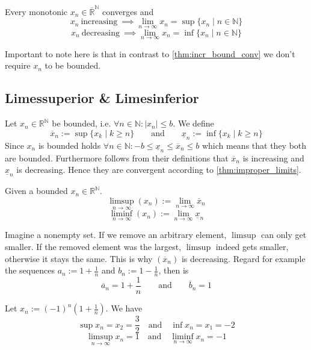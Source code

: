 \begin{theorem}\label{thm:improper_limits}
   Every monotonic \(x_n \in \overline{\mathbb{R}}^\mathbb{N}\) converges and
   \[x_n~\text{increasing}~\implies \lim_{n \to \infty} x_n = \sup\{x_n \mid n \in \mathbb{N}\}\]
   \[x_n~\text{decreasing}~\implies \lim_{n \to \infty} x_n = \inf\{x_n \mid n \in \mathbb{N}\}\]
\end{theorem}
\begin{remark}
   Important to note here is that in contrast to \cref{thm:incr_bound_conv} we don't require \(x_n\) to be bounded.
\end{remark}

\subsection{Limessuperior \& Limesinferior}
Let \(x_n \in \mathbb{R}^\mathbb{N}\) be bounded, i.e. \(\forall n \in \mathbb{N}: |x_n| \leq b\).
We define
\[\overline{x}_n := \sup\{x_k \mid k \geq n\} \qquad\text{and}\qquad \underline{x}_n := \inf\{x_k \mid k \geq n\}\]
Since \(x_n\) is bounded holds \(\forall n \in \mathbb{N}: -b \leq \underline{x}_n \leq \overline{x}_n \leq b\) which means that they both are bounded.
Furthermore follows from their definitions that \(\overline{x}_n\) is increasing and \(\underline{x}_n\) is decreasing.
Hence they are convergent according to \cref{thm:improper_limits}.

\begin{definition}
   Given a bounded \(x_n \in \mathbb{R}^\mathbb{N}\).
   \[\limsup_{n \to \infty}(x_n) := \lim_{n \to \infty} \overline{x}_n\]
   \[\liminf_{n \to \infty}(x_n) := \lim_{n \to \infty} \underline{x}_n\]
\end{definition}
\begin{remark}[Intuition]
   Imagine a nonempty set.
   If we remove an arbitrary element, \(\limsup\) can only get smaller.
   If the removed element was the largest, \(\limsup\) indeed gets smaller, otherwise it stays the same.
   This is why \((\overline{x}_n)\) is decreasing.
   Regard for example the sequences \(a_n := 1 + \frac{1}{n}\) and \(b_n := 1 - \frac{1}{n}\), then is
   \[\overline{a}_n = 1 + \frac{1}{n} \qquad\text{and}\qquad \overline{b}_n = 1\]
\end{remark}
\begin{example}
   Let \(x_n := (-1)^n \left(1 + \frac{1}{n}\right)\).
   We have
   \[\sup x_n = x_2 = \frac{3}{2} \quad\text{and}\quad \inf x_n = x_1 = -2\]
   \[\limsup_{n \to \infty} x_n = 1 \quad\text{and}\quad \liminf_{n \to \infty} x_n = -1\]
\end{example}

